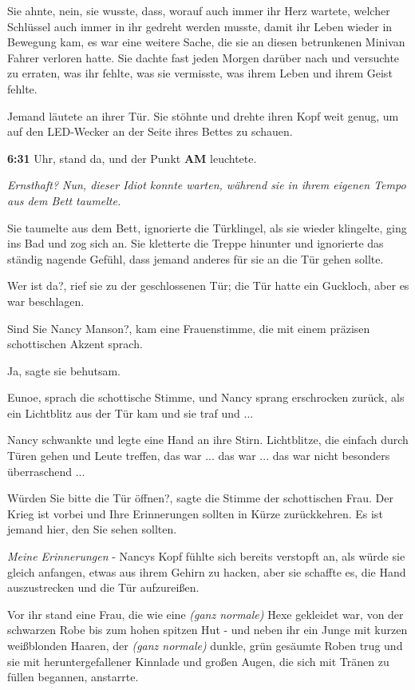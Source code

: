 Sie ahnte, nein, sie wusste, dass, worauf auch immer ihr Herz wartete, welcher
Schlüssel auch immer in ihr gedreht werden musste, damit ihr Leben wieder in
Bewegung kam, es war eine weitere Sache, die sie an diesen betrunkenen Minivan
Fahrer verloren hatte. Sie dachte fast jeden Morgen darüber nach und versuchte
zu erraten, was ihr fehlte, was sie vermisste, was ihrem Leben und ihrem Geist
fehlte.

Jemand läutete an ihrer Tür. Sie stöhnte und drehte ihren Kopf weit genug, um
auf den LED-Wecker an der Seite ihres Bettes zu schauen.

\textbf{6:31} Uhr, stand da, und der Punkt \textbf{AM} leuchtete.

\emph{Ernsthaft? Nun, dieser Idiot konnte warten, während sie in ihrem eigenen
Tempo aus dem Bett taumelte.}

Sie taumelte aus dem Bett, ignorierte die Türklingel, als sie wieder klingelte,
ging ins Bad und zog sich an. Sie kletterte die Treppe hinunter und ignorierte
das ständig nagende Gefühl, dass jemand anderes für sie an die Tür gehen sollte.

\glqq{}Wer ist da?\grqq{}, rief sie zu der geschlossenen Tür; die Tür hatte ein
Guckloch, aber es war beschlagen.

\glqq{}Sind Sie Nancy Manson?\grqq{}, kam eine Frauenstimme, die mit einem
präzisen schottischen Akzent sprach.

\glqq{}Ja\grqq{}, sagte sie behutsam.

\glqq{}Eunoe\grqq{}, sprach die schottische Stimme, und Nancy sprang erschrocken
zurück, als ein Lichtblitz aus der Tür kam und sie traf und ...

Nancy schwankte und legte eine Hand an ihre Stirn. Lichtblitze, die einfach
durch Türen gehen und Leute treffen, das war ... das war ... das war nicht
besonders überraschend ...

\glqq{}Würden Sie bitte die Tür öffnen?\grqq{}, sagte die Stimme der schottischen
Frau. \glqq{}Der Krieg ist vorbei und Ihre Erinnerungen sollten in Kürze
zurückkehren. Es ist jemand hier, den Sie sehen sollten.\grqq{}

\emph{Meine Erinnerungen} - Nancys Kopf fühlte sich bereits verstopft an, als
würde sie gleich anfangen, etwas aus ihrem Gehirn zu hacken, aber sie schaffte
es, die Hand auszustrecken und die Tür aufzureißen.

Vor ihr stand eine Frau, die wie eine \emph{(ganz normale)} Hexe gekleidet war,
von der schwarzen Robe bis zum hohen spitzen Hut - und neben ihr ein Junge mit
kurzen weißblonden Haaren, der \emph{(ganz normale)} dunkle, grün gesäumte Roben
trug und sie mit heruntergefallener Kinnlade und großen Augen, die sich mit
Tränen zu füllen begannen, anstarrte.

